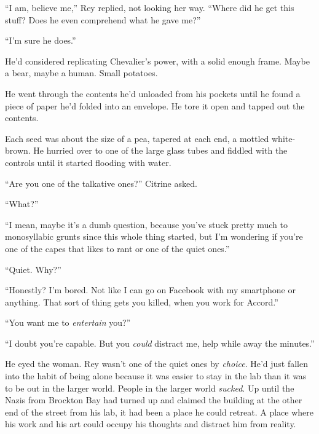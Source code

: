 ``I am, believe me,'' Rey replied, not looking her way.  ``Where did he get this stuff?  Does he even comprehend what he gave me?''



``I'm sure he does.''



He'd considered replicating Chevalier's power, with a solid enough frame.  Maybe a bear, maybe a human.  Small potatoes.



He went through the contents he'd unloaded from his pockets until he found a piece of paper he'd folded into an envelope.  He tore it open and tapped out the contents.



Each seed was about the size of a pea, tapered at each end, a mottled white-brown.  He hurried over to one of the large glass tubes and fiddled with the controls until it started flooding with water.



``Are you one of the talkative ones?'' Citrine asked.



``What?''



``I mean, maybe it's a dumb question, because you've stuck pretty much to monosyllabic grunts since this whole thing started, but I'm wondering if you're one of the capes that likes to rant or one of the quiet ones.''



``Quiet.  Why?''



``Honestly?  I'm bored.  Not like I can go on Facebook with my smartphone or anything.  That sort of thing gets you killed, when you work for Accord.''



``You want me to \emph{entertain} you?''



``I doubt you're capable.  But you \emph{could} distract me, help while away the minutes.''



He eyed the woman.  Rey wasn't one of the quiet ones by \emph{choice}.  He'd just fallen into the habit of being alone because it was easier to stay in the lab than it was to be out in the larger world.  People in the larger world \emph{sucked}.  Up until the Nazis from Brockton Bay had  turned up and claimed the building at the other end of the street from his lab, it had been a place he could retreat.  A place where his work and his art could occupy his thoughts and distract him from reality.



